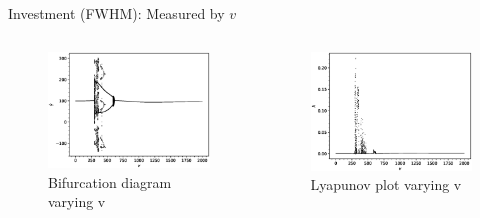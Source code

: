 \documentclass{beamer}
\begin{document}
\begin{frame}{Investment (FWHM): Measured by $v$}
	\begin{columns}
	\begin{column}{0.5\textwidth}
		\begin{figure}
			\centering
			\includegraphics[width=1.2\textwidth]{vbifurcation.eps}
			\caption{Bifurcation diagram varying v}
		\end{figure}
	\end{column}
	\begin{column}{0.5\textwidth}
		\begin{figure}
			\centering
			\includegraphics[width=1.2\textwidth]{vlyplot.eps}
			\caption{Lyapunov plot varying v}
		\end{figure}
	\end{column}
	\end{columns}
\end{frame}
\end{document}
